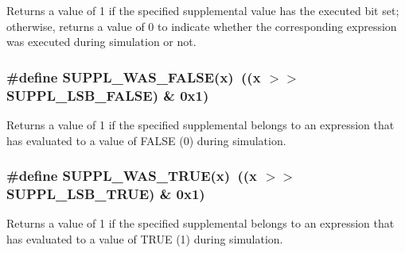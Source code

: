 Returns a value of 1 if the specified supplemental value has the executed bit set; otherwise, returns a value of 0 to indicate whether the corresponding expression was executed during simulation or not. 
\subsubsection{\setlength{\rightskip}{0pt plus 5cm}\#define SUPPL\_\-WAS\_\-FALSE(x)\ ((x $>$$>$ SUPPL\_\-LSB\_\-FALSE) \& 0x1)}\label{group__expr__suppl_a12}


Returns a value of 1 if the specified supplemental belongs to an expression that has evaluated to a value of FALSE (0) during simulation. 
\subsubsection{\setlength{\rightskip}{0pt plus 5cm}\#define SUPPL\_\-WAS\_\-TRUE(x)\ ((x $>$$>$ SUPPL\_\-LSB\_\-TRUE) \& 0x1)}\label{group__expr__suppl_a11}


Returns a value of 1 if the specified supplemental belongs to an expression that has evaluated to a value of TRUE (1) during simulation. 